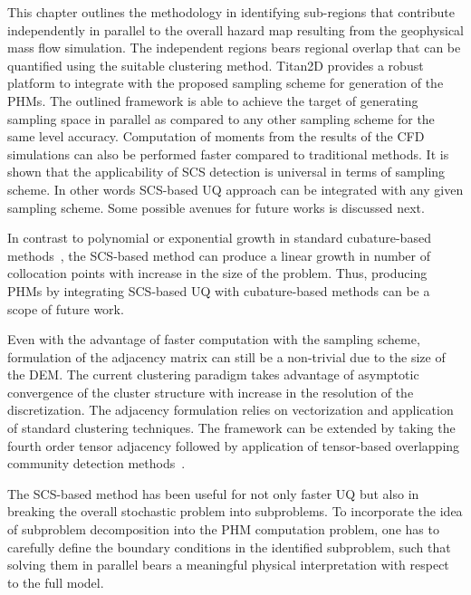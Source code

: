 This chapter outlines the methodology in identifying sub-regions that contribute independently in parallel to the overall hazard map resulting from the geophysical mass flow simulation. The independent regions bears regional overlap that can be quantified using the suitable clustering method. Titan2D provides a robust platform to integrate with the proposed sampling scheme for generation of the PHMs. The outlined framework is able to achieve the target of generating sampling space in parallel as compared to any other sampling scheme for the same level accuracy. Computation of moments from the results of the CFD simulations can also be performed faster compared to traditional methods. It is shown that the applicability of SCS detection is universal in terms of sampling scheme. In other words SCS-based UQ approach can be integrated with any given sampling scheme. Some possible avenues for future works is discussed next.

In contrast to polynomial or exponential growth in standard cubature-based methods~\cite{stroud1971approximate}, the SCS-based method can produce a linear growth in number of collocation points with increase in the size of the problem. Thus, producing PHMs by integrating SCS-based UQ with cubature-based methods can be a scope of future work.

Even with the advantage of faster computation with the sampling scheme, formulation of the adjacency matrix can still be a non-trivial due to the size of the DEM. The current clustering paradigm takes advantage of asymptotic convergence of the cluster structure with increase in the resolution of the discretization. The adjacency formulation relies on vectorization and application of standard clustering techniques. The framework can be extended by taking the fourth order tensor adjacency followed by application of tensor-based overlapping community detection methods~\cite{benson2015tensor,shashua2005non,huang2013fast}.  

The SCS-based method has been useful for not only faster UQ but also in breaking the overall stochastic problem into subproblems. To incorporate the idea of subproblem decomposition into the PHM computation problem, one has to carefully define the boundary conditions in the identified subproblem, such that solving them in parallel bears a meaningful physical interpretation with respect to the full model. 